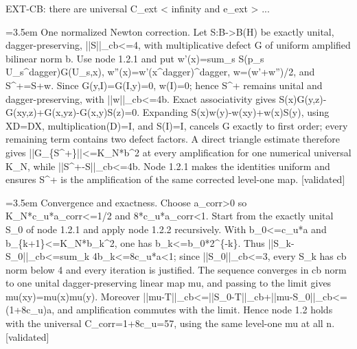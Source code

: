 \documentclass{article}
\newcommand{\step}[1]{\par\noindent\hangindent=3.5em\hangafter=1%
  \makebox[3.5em][l]{\textbf{#1.}}}
\newcommand{\steptag}[1]{\hfill{\small\textsf{[#1]}}}
\begin{document}
\begin{proofbox}{EXT-CB: there are universal C\_ext < infinity and e\_ext > ...}
\step{1.2.2} One normalized Newton correction. Let S:B->B(H) be exactly unital, dagger-preserving, ||S||\_cb<=4, with multiplicative defect G of uniform amplified bilinear norm b. Use node 1.2.1 and put w'(x)=sum\_s S(p\_s U\_s\textasciicircum{}dagger)G(U\_s,x), w''(x)=w'(x\textasciicircum{}dagger)\textasciicircum{}dagger, w=(w'+w'')/2, and S\textasciicircum{}+=S+w. Since G(y,I)=G(I,y)=0, w(I)=0; hence S\textasciicircum{}+ remains unital and dagger-preserving, with ||w||\_cb<=4b. Exact associativity gives S(x)G(y,z)-G(xy,z)+G(x,yz)-G(x,y)S(z)=0. Expanding S(x)w(y)-w(xy)+w(x)S(y), using XD=DX, multiplication(D)=I, and S(I)=I, cancels G exactly to first order; every remaining term contains two defect factors. A direct triangle estimate therefore gives ||G\_\{S\textasciicircum{}+\}||<=K\_N*b\textasciicircum{}2 at every amplification for one numerical universal K\_N, while ||S\textasciicircum{}+-S||\_cb<=4b. Node 1.2.1 makes the identities uniform and ensures S\textasciicircum{}+ is the amplification of the same corrected level-one map. \steptag{validated} \\[4pt]
\step{1.2.3} Convergence and exactness. Choose a\_corr>0 so K\_N*c\_u*a\_corr<=1/2 and 8*c\_u*a\_corr<1. Start from the exactly unital S\_0 of node 1.2.1 and apply node 1.2.2 recursively. With b\_0<=c\_u*a and b\_\{k+1\}<=K\_N*b\_k\textasciicircum{}2, one has b\_k<=b\_0*2\textasciicircum{}\{-k\}. Thus ||S\_k-S\_0||\_cb<=sum\_k 4b\_k<=8c\_u*a<1; since ||S\_0||\_cb<=3, every S\_k has cb norm below 4 and every iteration is justified. The sequence converges in cb norm to one unital dagger-preserving linear map mu, and passing to the limit gives mu(xy)=mu(x)mu(y). Moreover ||mu-T||\_cb<=||S\_0-T||\_cb+||mu-S\_0||\_cb<=(1+8c\_u)a, and amplification commutes with the limit. Hence node 1.2 holds with the universal C\_corr=1+8c\_u=57, using the same level-one mu at all n. \steptag{validated} \\[6pt]

\end{proofbox}
\end{document}
